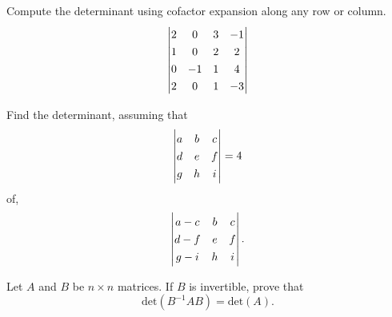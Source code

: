 \documentclass[12pt,letterpaper]{hmcpset}
\newcommand{\dm}[1]{\left| \renewcommand*{\arraystretch}{1.3} \begin{matrix} #1 \end{matrix} \right|}
\begin{document}
\begin{solution}
\vfill
\end{solution}
\newpage

\begin{problem}[4.2.14]
  Compute the determinant using cofactor expansion along any row or column.
  $$ \dm{2 & 0 & 3 & -1 \\ 1 & 0 & 2 & 2 \\ 0 & -1 & 1 & 4 \\ 2 & 0 & 1 & -3} $$
\end{problem}

\begin{solution}
\vfill
\end{solution}
\newpage

\begin{problem}[4.2.38]
  Find the determinant, assuming that
  $$ \dm{a & b & c \\ d & e & f \\ g & h & i} = 4$$
  of,
  $$ \dm{a - c & b & c \\ d - f & e & f \\ g - i & h & i} .$$
\end{problem}

\begin{solution}
\vfill
\end{solution}
\newpage

\begin{problem}[4.2.54]
  Let $A$ and $B$ be $n \times n$ matrices. If $B$ is invertible, prove that 
  $$\text{det}(B^{-1} AB) = \text{det}(A).$$
\end{problem}

\begin{solution}
\vfill
\end{solution}
\end{document}
